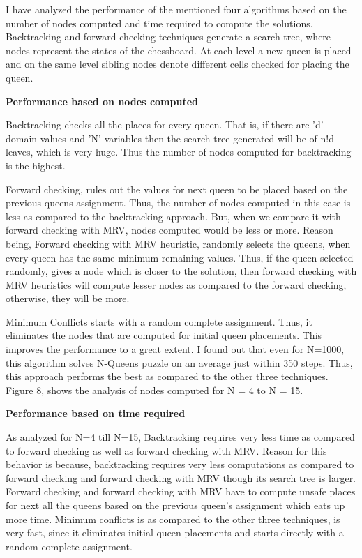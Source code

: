\documentclass[conference]{IEEEtran}
\begin{document}
I have analyzed the performance of the mentioned four algorithms based on the number of nodes computed and time required to compute the solutions. Backtracking and forward checking techniques generate a search tree, where nodes represent the states of the chessboard. At each level a new queen is placed and on the same level sibling nodes denote different cells checked for placing the queen.
\par \textbf{Performance based on nodes computed}
\par Backtracking checks all the places for every queen. That is, if there are 'd' domain values and 'N' variables then the search tree generated will be of n!d leaves, which is very huge. Thus the number of nodes computed for backtracking is the highest.
\par Forward checking, rules out the values for next queen to be placed based on the previous queens assignment. Thus, the number of nodes computed in this case is less as compared to the backtracking approach. But, when we compare it with forward checking with MRV, nodes computed would be less or more. Reason being, Forward checking with MRV heuristic, randomly selects the queens, when every queen has the same minimum remaining values. Thus, if the queen selected randomly, gives a node which is closer to the solution, then forward checking with MRV heuristics will compute lesser nodes as compared to the forward checking, otherwise, they will be more.
\par Minimum Conflicts starts with a random complete assignment. Thus, it eliminates the nodes that are computed for initial queen placements. This improves the performance to a great extent. I found out that even for N=1000, this algorithm solves N-Queens puzzle on an average just within 350 steps. Thus, this approach performs the best as compared to the other three techniques.
\\ Figure 8, shows the analysis of nodes computed for N = 4 to N = 15.



\par \textbf{Performance based on time required}

As analyzed for N=4 till N=15, Backtracking requires very less time as compared to forward checking as well as forward checking with MRV. Reason for this behavior is because, backtracking requires very less computations as compared to forward checking and forward checking with MRV though its search tree is larger. Forward checking and forward checking with MRV have to compute unsafe places for next all the queens based on the previous queen's assignment which eats up more time. Minimum conflicts is as compared to the other three techniques, is very fast, since it eliminates initial queen placements and starts directly with a random complete assignment.
\end{document}
